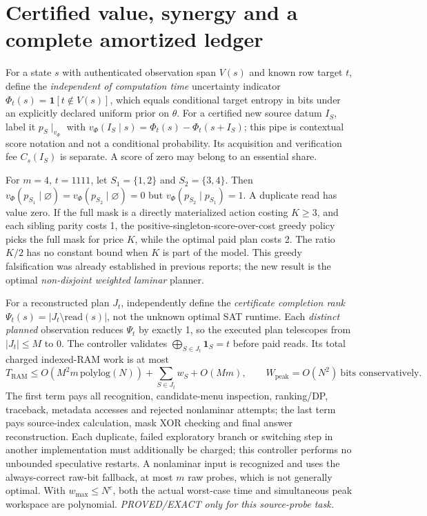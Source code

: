 \documentclass[11pt]{article}
\begin{document}
\section{Certified value, synergy and a complete amortized ledger}
For a state $s$ with authenticated observation span $V(s)$ and known row target $t$, define the \emph{independent of computation time} uncertainty indicator $\Phi_t(s)=\mathbf1[t\notin V(s)]$, which equals conditional target entropy in bits under an explicitly declared uniform prior on $\theta$. For a certified new source datum $I_S$, label it $p_S\mid_{v_{\Phi}}$ with $v_\Phi(I_S\mid s)=\Phi_t(s)-\Phi_t(s+I_S)$; this pipe is contextual score notation and not a conditional probability. Its acquisition and verification fee $C_s(I_S)$ is separate. A score of zero may belong to an essential share.

For $m=4$, $t=1111$, let $S_1=\{1,2\}$ and $S_2=\{3,4\}$. Then $v_\Phi(p_{S_1}\mid\varnothing)=v_\Phi(p_{S_2}\mid\varnothing)=0$ but $v_\Phi(p_{S_2}\mid p_{S_1})=1$. A duplicate read has value zero. If the full mask is a directly materialized action costing $K\ge3$, and each sibling parity costs 1, the positive-singleton-score-over-cost greedy policy picks the full mask for price $K$, while the optimal paid plan costs 2. The ratio $K/2$ has no constant bound when $K$ is part of the model. This greedy falsification was already established in previous reports; the new result is the optimal \emph{non-disjoint weighted laminar} planner.

For a reconstructed plan $J_t$, independently define the \emph{certificate completion rank} $\Psi_t(s)=|J_t\setminus\mathrm{read}(s)|$, not the unknown optimal SAT runtime. Each \emph{distinct planned} observation reduces $\Psi_t$ by exactly 1, so the executed plan telescopes from $|J_t|\le M$ to 0. The controller validates $\bigoplus_{S\in J_t}\mathbf1_S=t$ before paid reads. Its total charged indexed-RAM work is at most
\[
T_{\mathrm{RAM}}\le O(M^2m\,\mathrm{polylog}(N))+\sum_{S\in J_t}w_S+O(Mm),
\qquad W_{\mathrm{peak}}=O(N^2)\ \text{bits conservatively}.
\]
The first term pays all recognition, candidate-menu inspection, ranking/DP, traceback, metadata accesses and rejected nonlaminar attempts; the last term pays source-index calculation, mask XOR checking and final answer reconstruction. Each duplicate, failed exploratory branch or switching step in another implementation must additionally be charged; this controller performs no unbounded speculative restarts. A nonlaminar input is recognized and uses the always-correct raw-bit fallback, at most $m$ raw probes, which is not generally optimal. With $w_{\max}\le N^c$, both the actual worst-case time and simultaneous peak workspace are polynomial. \emph{PROVED/EXACT only for this source-probe task.}
\end{document}
